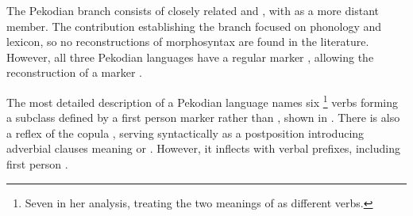 \subsubsection{\PPek {}}
\label{sec:pekodian}
The Pekodian branch consists of closely related \arara and \ikpeng, with \bakairi as a more distant member.
The contribution establishing the branch \parencite{meira2005southern} focused on phonology and lexicon, so no reconstructions of \PPek morphosyntax are found in the literature.
However, all three Pekodian languages have a regular  marker  , allowing the reconstruction of a \PPek {} marker .




The most detailed description of a Pekodian language \parencite{alves2017arara} names six%
\footnote{Seven in her analysis, treating the two meanings of   as different verbs.}
\arara {} verbs forming a subclass defined by a first person marker  rather than , shown in .
There is also a reflex of the copula  , serving syntactically as a postposition introducing adverbial clauses meaning  or  \parencite[199--201]{alves2017arara}.
However, it inflects with verbal \setone prefixes, including first person  .

